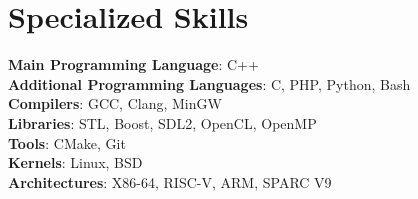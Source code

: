 \documentclass[letterpaper,11pt]{article}
\makeatletter
\newcommand{\resumeSubheading}[4]{
    \vspace{-2pt}\item
    \begin{tabular*}{0.97\textwidth}[t]{l@{\extracolsep{\fill}}r}
        \textbf{#1} & #2 \\
        \textit{\small #3} & \textit{\small #4} \\
    \end{tabular*}\vspace{-10pt}
}
\newcommand{\resumeSubHeadingListStart}{\begin{itemize}[leftmargin=0.15in, label={}]}
\newcommand{\resumeSubHeadingListEnd}{\end{itemize}}
\makeatother
\begin{document}


\section{Specialized Skills}
\begin{itemize}[leftmargin=0.15in, label={}]
    \normalsize{\item{
                    \textbf{Main Programming Language}{: C++} \\
                    \textbf{Additional Programming Languages}{: C, PHP, Python, Bash} \\
                    \textbf{Compilers}{: GCC, Clang, MinGW} \\
                    \textbf{Libraries}{: STL, Boost, SDL2, OpenCL, OpenMP} \\
                    \textbf{Tools}{: CMake, Git} \\
                    \textbf{Kernels}{: Linux, BSD} \\
                    \textbf{Architectures}{: X86-64, RISC-V, ARM, SPARC V9} \\
              }}
\end{itemize}
\end{document}
